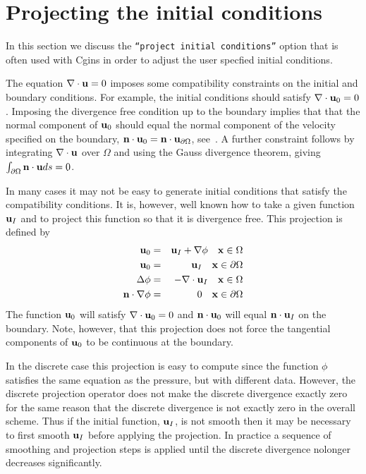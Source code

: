 \section{Projecting the initial
            conditions}  \label{sec:projectIC}
 
In this section we discuss the {\tt ``project initial conditions''} option
that is often used with Cgins in order to adjust the user specfied
initial conditions. 

 
The equation $\nabla\cdot\mathbf{ u}=0$ imposes some compatibility constraints
on the initial and boundary conditions. For example,
the initial conditions should
satisfy $\nabla\cdot\mathbf{ u}_0=0$. Imposing the divergence free condition
up to the boundary implies that
 that the normal component of
$\mathbf{ u}_0$ should equal the normal component of the velocity specified
on the boundary, $\mathbf{ n}\cdot\mathbf{ u}_0=\mathbf{ n}\cdot\mathbf{ u}_{\partial\Omega}$,
see~\cite{Gresho92}. A further constraint follows by integrating
$\nabla\cdot\mathbf{ u}$ over $\Omega$ and using the
Gauss divergence theorem, giving
$\int_{\partial \Omega} \mathbf{ n}\cdot\mathbf{ u} ds = 0$.
 
In many cases it may not be easy to generate initial conditions that
satisfy the compatibility conditions. It is, however, well known how
to take a given function $\mathbf{ u}_I$ and to project this
function so that it is divergence free.
This projection is defined by
\begin{eqnarray*}
        \mathbf{ u}_0 &=& \mathbf{ u}_I + \nabla \phi  ~~~\mathbf{ x}\in \Omega  \\
        \mathbf{ u}_0 &=& \mathbf{ u}_I               ~~~\mathbf{ x}\in \partial\Omega  \\
  \Delta \phi &=& - \nabla\cdot\mathbf{ u}_I ~~~\mathbf{ x}\in\Omega\\
   \mathbf{ n}\cdot\nabla\phi &=& 0          ~~~\mathbf{ x}\in\partial\Omega
\end{eqnarray*}
The function $\mathbf{ u}_0$ will satisfy
 $\nabla\cdot\mathbf{ u}_0=0$ and $\mathbf{ n}\cdot\mathbf{ u}_0$
will equal $\mathbf{ n}\cdot\mathbf{ u}_I$ on the boundary.
Note, however, that this projection does not force the
tangential components of $\mathbf{ u}_0$ to be continuous at the boundary.
 
In the discrete case this projection is easy to compute since the
function $\phi$ satisfies the same equation as the pressure, but with
different data.  However, the discrete projection operator does not
make the discrete divergence exactly zero for the same reason that the
discrete divergence is not exactly zero in the overall scheme.  Thus
if the initial function, $\mathbf{ u}_I$, is not smooth then it may be
necessary to first smooth $\mathbf{ u}_I$ before applying the projection.  In
practice a sequence of smoothing and projection steps is applied until
the discrete divergence nolonger decreases significantly.